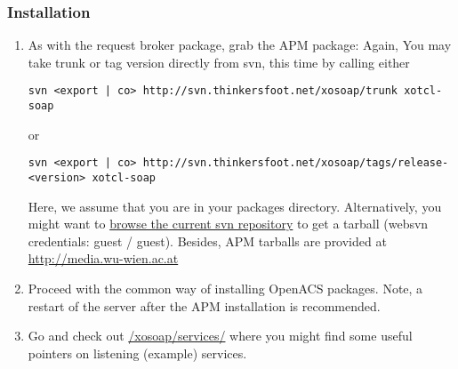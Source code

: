	\subsubsection{Installation}
	\begin{enumerate}
	\item As with the request broker package, grab the APM package: Again, You may take trunk or tag version directly from svn, this time by calling either
	\begin{lstlisting}[breaklines=true,frame=single,basicstyle=
\footnotesize]
	svn <export | co> http://svn.thinkersfoot.net/xosoap/trunk xotcl-soap
	\end{lstlisting}
	or
	\begin{lstlisting}[breaklines=true,frame=single,basicstyle=
\footnotesize]
	svn <export | co> http://svn.thinkersfoot.net/xosoap/tags/release-<version> xotcl-soap
	\end{lstlisting}
	Here, we assume that you are in your packages directory. Alternatively, you might want to \href{http://stefan.thinkersfoot.net/websvn/listing.php?repname=xosoap&path=\%2F&sc=0}{browse the current svn repository} to get a tarball (websvn credentials: guest / guest). Besides, APM tarballs are provided at \href{http://media.wu-wien.ac.at/download/}{http://media.wu-wien.ac.at}
	\item Proceed with the common way of installing OpenACS packages. Note, a restart of the server after the APM installation is recommended.
	\item Go and check out  \href{/xosoap/services/}{/xosoap/services/} where you might find some useful pointers on listening (example) services. 
	\end{enumerate}
